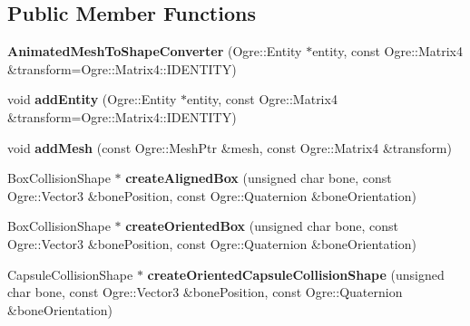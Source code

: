 \subsection*{Public Member Functions}
\begin{DoxyCompactItemize}
\item 
\hypertarget{class_ogre_bullet_collisions_1_1_animated_mesh_to_shape_converter_aedf4c4317fe257fa248c584f73a5b07e}{{\bfseries Animated\-Mesh\-To\-Shape\-Converter} (Ogre\-::\-Entity $\ast$entity, const Ogre\-::\-Matrix4 \&transform=Ogre\-::\-Matrix4\-::\-I\-D\-E\-N\-T\-I\-T\-Y)}\label{class_ogre_bullet_collisions_1_1_animated_mesh_to_shape_converter_aedf4c4317fe257fa248c584f73a5b07e}

\item 
\hypertarget{class_ogre_bullet_collisions_1_1_animated_mesh_to_shape_converter_ad99910d169c2f27a64cbc32499d9a2f6}{void {\bfseries add\-Entity} (Ogre\-::\-Entity $\ast$entity, const Ogre\-::\-Matrix4 \&transform=Ogre\-::\-Matrix4\-::\-I\-D\-E\-N\-T\-I\-T\-Y)}\label{class_ogre_bullet_collisions_1_1_animated_mesh_to_shape_converter_ad99910d169c2f27a64cbc32499d9a2f6}

\item 
\hypertarget{class_ogre_bullet_collisions_1_1_animated_mesh_to_shape_converter_a26a59f1db578e3e08949d839646ee81c}{void {\bfseries add\-Mesh} (const Ogre\-::\-Mesh\-Ptr \&mesh, const Ogre\-::\-Matrix4 \&transform)}\label{class_ogre_bullet_collisions_1_1_animated_mesh_to_shape_converter_a26a59f1db578e3e08949d839646ee81c}

\item 
\hypertarget{class_ogre_bullet_collisions_1_1_animated_mesh_to_shape_converter_a0593a0e8cd5f076b15e8b4f60b3507f0}{Box\-Collision\-Shape $\ast$ {\bfseries create\-Aligned\-Box} (unsigned char bone, const Ogre\-::\-Vector3 \&bone\-Position, const Ogre\-::\-Quaternion \&bone\-Orientation)}\label{class_ogre_bullet_collisions_1_1_animated_mesh_to_shape_converter_a0593a0e8cd5f076b15e8b4f60b3507f0}

\item 
\hypertarget{class_ogre_bullet_collisions_1_1_animated_mesh_to_shape_converter_a0e58a873f3b72749bdd764035a54a4f1}{Box\-Collision\-Shape $\ast$ {\bfseries create\-Oriented\-Box} (unsigned char bone, const Ogre\-::\-Vector3 \&bone\-Position, const Ogre\-::\-Quaternion \&bone\-Orientation)}\label{class_ogre_bullet_collisions_1_1_animated_mesh_to_shape_converter_a0e58a873f3b72749bdd764035a54a4f1}

\item 
\hypertarget{class_ogre_bullet_collisions_1_1_animated_mesh_to_shape_converter_afa5359d06b4d8c8cd65484070976218d}{Capsule\-Collision\-Shape $\ast$ {\bfseries create\-Oriented\-Capsule\-Collision\-Shape} (unsigned char bone, const Ogre\-::\-Vector3 \&bone\-Position, const Ogre\-::\-Quaternion \&bone\-Orientation)}\label{class_ogre_bullet_collisions_1_1_animated_mesh_to_shape_converter_afa5359d06b4d8c8cd65484070976218d}

\end{DoxyCompactItemize}
